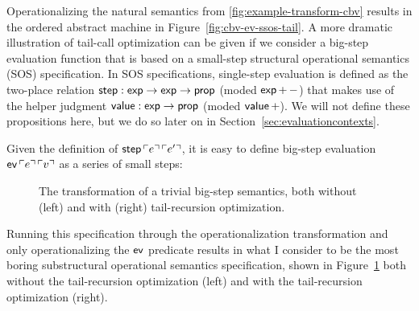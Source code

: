 Operationalizing the natural semantics from
\ref{fig:example-transform-cbv} results in the ordered abstract
machine in Figure~\ref{fig:cbv-ev-ssos-tail}.  A more dramatic
illustration of tail-call optimization can be given if we consider a
big-step evaluation function that is based on a small-step structural
operational semantics (SOS) specification. In SOS specifications,
single-step evaluation is defined as the two-place relation ${\sf
  step} : {\sf exp} \rightarrow {\sf exp} \rightarrow {\sf prop}$
(moded ${\sf exp}\,{+}\,{-}$) that makes use of the helper judgment
${\sf value} : {\sf exp} \rightarrow {\sf prop}$ (moded ${\sf
  value}\,{+}$). We will not define these propositions here, but we do
so later on in Section~\ref{sec:evaluationcontexts}.

Given the definition of ${\sf step}\,{\ulcorner{e}\urcorner}\,{\ulcorner{e'}\urcorner}$, it is
easy to define big-step evaluation ${\sf ev}\,{\ulcorner{e}\urcorner}\,{\ulcorner{v}\urcorner}$
as a series of small steps:

\smallskip
{}
\smallskip

\begin{figure}
\begin{minipage}[b]{0.55\linewidth}
\end{minipage}
\hspace{0.5cm}
\begin{minipage}[b]{0.45\linewidth}
\end{minipage}
\caption{The transformation of a trivial big-step semantics, both
  without (left) and with (right) tail-recursion optimization.}
\label{fig:sos-tailrecursion}
\end{figure}

Running this specification through the operationalization
transformation and only operationalizing the ${\sf ev}$ predicate
results in what I consider to be the most boring substructural
operational semantics specification, shown in
Figure~\ref{fig:sos-tailrecursion} both without the tail-recursion
optimization (left) and with the tail-recursion optimization (right).

